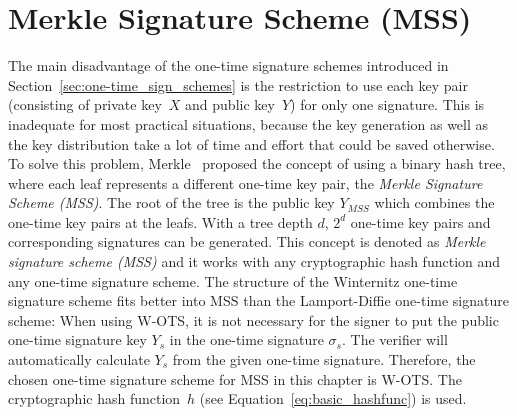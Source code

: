 

\section{Merkle Signature Scheme (MSS)} 
\label{sec:mss}
The main disadvantage of the one-time signature schemes introduced in Section~\ref{sec:one-time_sign_schemes} is the restriction to use each key pair (consisting of private key~$X$ and public key~$Y$) for only one signature. This is inadequate for most practical situations, because the key generation as well as the key distribution take a lot of time and effort that could be saved otherwise.
To solve this problem, Merkle~\cite{cha:bg_merkletrees_Merkle_1979} proposed the concept of using a binary hash tree, where each leaf represents a different one-time key pair, the \textit{Merkle Signature Scheme (MSS)}. The root of the tree is the public key $Y_{MSS}$  which combines the one-time key pairs at the leafs. With a tree depth $d$, $2^d$ one-time key pairs and corresponding signatures can be generated. %
This concept is denoted as \textit{Merkle signature scheme (MSS)} and it works with any cryptographic hash function and any one-time signature scheme. 
The structure of the Winternitz one-time signature scheme fits better into MSS than the Lamport-Diffie one-time signature scheme: When using W-OTS, it is not necessary for the signer to put the public one-time signature key $Y_s$ in the one-time signature $\sigma_s$. The verifier will automatically calculate $Y_s$ from the given one-time signature. Therefore, the chosen one-time signature scheme for MSS in this chapter is W-OTS. The cryptographic hash function~$h$ (see Equation~\ref{eq:basic_hashfunc}) is used. 

